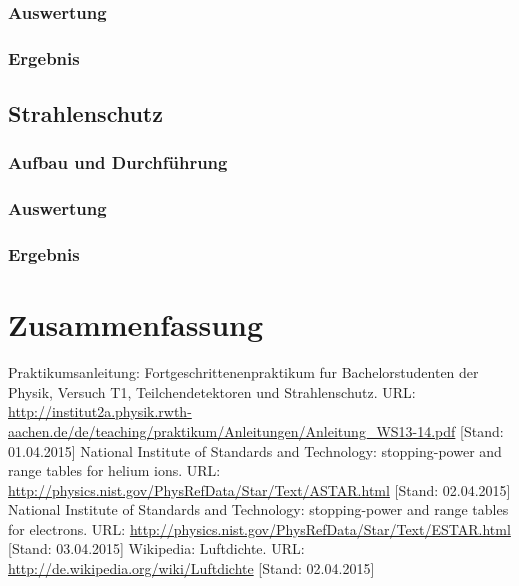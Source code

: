 \documentclass{../Misc/MontavonLaTeX/Montavon}
\begin{document}
\subsubsection{Auswertung}
\subsubsection{Ergebnis}

\subsection{Strahlenschutz}
\subsubsection{Aufbau und Durchführung}
\subsubsection{Auswertung}
\subsubsection{Ergebnis}

\section{Zusammenfassung}

\newpage
\begin{thebibliography}{xxxx}
 Praktikumsanleitung: Fortgeschrittenenpraktikum fur Bachelorstudenten der Physik, Versuch T1, Teilchendetektoren und Strahlenschutz. URL: \url{http://institut2a.physik.rwth-aachen.de/de/teaching/praktikum/Anleitungen/Anleitung_WS13-14.pdf} [Stand: 01.04.2015]
 National Institute of Standards and Technology: stopping-power and range tables for helium ions. URL: \url{http://physics.nist.gov/PhysRefData/Star/Text/ASTAR.html} [Stand: 02.04.2015]
 National Institute of Standards and Technology: stopping-power and range tables for electrons. URL: \url{http://physics.nist.gov/PhysRefData/Star/Text/ESTAR.html} [Stand: 03.04.2015]
 Wikipedia: Luftdichte. URL: \url{http://de.wikipedia.org/wiki/Luftdichte} [Stand: 02.04.2015]
\end{thebibliography}
\end{document}
